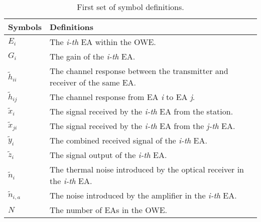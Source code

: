 \begin{table}
\centering
\begin{tabularx}{0.48\textwidth}{l L}
\toprule
\textbf{Symbols}&\textbf{Definitions}\\  \midrule 
$E_i$&The \textit{i-th} EA within the OWE.\\ [0.1cm]
$G_i$&The gain of the \textit{i-th} EA.\\ [0.1cm]
$\widetilde{h}_{ii}$&The channel response between the transmitter and receiver of the same EA.\\ [0.1cm]
$\widetilde{h}_{ij}$&The channel response from EA \textit{i} to EA \textit{j}.\\ [0.1cm]
$\widetilde{x}_i$&The signal received by the \textit{i-th} EA from the station.\\ [0.1cm]
$\widetilde{x}_{ji}$&The signal received by the \textit{i-th} EA from the \textit{j-th} EA.\\ [0.1cm]
$\widetilde{y}_i$&The combined received signal of the \textit{i-th} EA.\\ [0.1cm]
$\widetilde{z}_i$&The signal output of the \textit{i-th} EA.\\ [0.1cm]
$\widetilde{n}_i$& The thermal noise introduced by the optical receiver in the \textit{i-th} EA. \\ [0.4cm]
$\widetilde{n}_{i,a}$&The noise introduced by the amplifier in the \textit{i-th} EA. \\ [0.1cm]
$N$ & The number of EAs in the OWE.\\
\bottomrule
\end{tabularx}
\caption{First set of symbol definitions.}
\label{Table1}
\vspace{-0.5cm}
\end{table}


